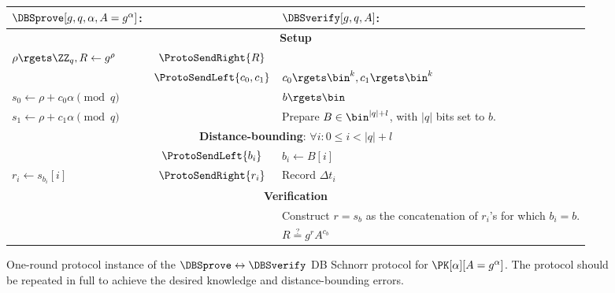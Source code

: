 \begin{figure*}
  \centering
  \begin{tabular}{p{5cm}cp{5cm}}
    \(\DBSprove[g, q, \alpha, A = g^\alpha]\):
    & &
    \(\DBSverify[g, q, A]\):
    \\
    \midrule

    \multicolumn{3}{c}{\textbf{Setup}} \\

    \(\rho\rgets \ZZ_q, R\gets g^{\rho}\)
    & \(\ProtoSendRight{R}\)
    &
    \\

    & \(\ProtoSendLeft{c_0, c_1}\)
    & \(c_0\rgets \bin^k, c_1\rgets \bin^k\)
    \\

    \(s_0\gets \rho + c_0\alpha \pmod q\)
    &
    & \(b\rgets \bin\)
    \\

    \(s_1\gets \rho + c_1\alpha \pmod q\)
    &
    & Prepare \(B\in \bin^{|q|+l}\), with \(|q|\) bits set to \(b\).
    \\

    \midrule
    \multicolumn{3}{c}{\textbf{Distance-bounding}: \(\forall i: 0\leq i < |q| + 
        l\)} \\


    & \(\ProtoSendLeft{b_i}\)
    & \(b_i\gets B[i]\)
    \\

    \(r_i\gets s_{b_i}[i]\)
    & \(\ProtoSendRight{r_i}\)
    & Record \(\Delta t_i\)
    \\

    \midrule
    \multicolumn{3}{c}{\textbf{Verification}}
    \\

    &
    & Construct \(r = s_b\) as the concatenation of \(r_i\)'s for which \(b_i = 
      b\).
    \\

    &
    & \(R \stackrel{?}{=} g^r A^{c_b}\)
    \\
    
  \end{tabular}
  \caption{%
    One-round protocol instance of the \(\DBSprove\leftrightarrow \DBSverify\) \ac{DB} Schnorr protocol for \(\PK[\alpha][A = g^\alpha]\).
    The protocol should be repeated in full to achieve the desired knowledge and distance-bounding errors.
  }%
  \label{SchnorrFigure}
\end{figure*}

